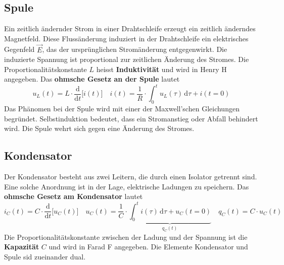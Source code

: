 \subsection{Spule}
Ein zeitlich ändernder Strom in einer Drahtschleife erzeugt ein zeitlich änderndes Magnetfeld. Diese Flussänderung induziert in der Drahtschleife ein elektrisches Gegenfeld $\overrightarrow{E}$, das der ursprünglichen Stromänderung entgegenwirkt.
\newline\newline
Die induzierte Spannung ist proportional zur zeitlichen Änderung des Stromes. Die Proportionalitätskonstante $L$ heisst \textbf{Induktivität} und wird in Henry H angegeben. Das \textbf{ohmsche Gesetz an der Spule} lautet
\begin{equation}
\boxed{u_L\left(t\right)=L\cdot \dfrac{\text{d}}{\text{d}t}\Big[i\left(t\right)\Big]}\quad \boxed{i\left(t\right)=\dfrac{1}{R}\cdot \displaystyle \int_0^tu_L\left(\tau\right)\,\text{d}\tau+i\left(t=0\right)}
\end{equation}
Das Phänomen bei der Spule wird mit einer der Maxwell'schen Gleichungen begründet. Selbstinduktion bedeutet, dass ein Stromanstieg oder Abfall behindert wird. Die Spule wehrt sich gegen eine Änderung des Stromes.
\subsection{Kondensator}
Der Kondensator besteht aus zwei Leitern, die durch einen Isolator getrennt sind. Eine solche Anordnung ist in der Lage, elektrische Ladungen zu speichern. Das \textbf{ohmsche Gesetz am Kondensator} lautet
\begin{equation}
\boxed{i_C\left(t\right)=C\cdot \dfrac{\text{d}}{\text{d}t}\Big[u_C\left(t\right)\Big]}\quad \boxed{u_C\left(t\right)=\dfrac{1}{C}\cdot \underbrace{\displaystyle \int_0^ti\left(\tau\right)\,\text{d}\tau+u_C\left(t=0\right)}_{q_C\left(t\right)}}\quad \boxed{q_C\left(t\right)=C\cdot u_C\left(t\right)}
\end{equation}
Die Proportionalitätskonstante zwischen der Ladung und der Spannung ist die \textbf{Kapazität} $C$ und wird in Farad F angegeben. Die Elemente Kondensator und Spule sid zueinander dual.
